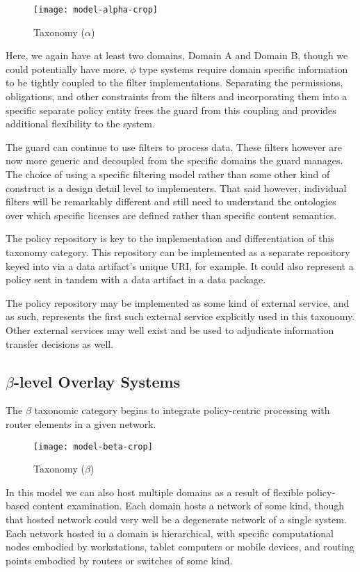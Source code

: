 \begin{figure}[!t]
\centering
\texttt{[image: model-alpha-crop]}
\caption{Taxonomy ($\alpha$)}
\label{fig:model:taxonomy-alpha}
\end{figure}

Here, we again have at least two domains, Domain A and Domain B, though we could potentially have more.  $\phi$ type systems require domain specific information to be tightly coupled to the filter implementations.  Separating the permissions, obligations, and other constraints from the filters and incorporating them into a specific separate policy entity frees the guard from this coupling and provides additional flexibility to the system.

The guard can continue to use filters to process data.  These filters however are now more generic and decoupled from the specific domains the guard manages.  The choice of using a specific filtering model rather than some other kind of construct is a design detail level to implementers.  That said however, individual filters will be remarkably different and still need to understand the ontologies over which specific licenses are defined rather than specific content semantics.

The policy repository is key to the implementation and differentiation of this taxonomy category.  This repository can be implemented as a separate repository keyed into via a data artifact's unique URI, for example.  It could also represent a policy sent in tandem with a data artifact in a data package.

The policy repository may be implemented as some kind of external service, and as such, represents the first such external service explicitly used in this taxonomy.  Other external services may well exist and be used to adjudicate information transfer decisions as well.

\subsection{$\beta$-level Overlay Systems}
The $\beta$ taxonomic category begins to integrate policy-centric processing with router elements in a given network.

\begin{figure}[!t]
\centering
\texttt{[image: model-beta-crop]}
\caption{Taxonomy ($\beta$)}
\label{fig:model:taxonomy-beta}
\end{figure}

In this model we can also host multiple domains as a result of flexible policy-based content examination.  Each domain hosts a network of some kind, though that hosted network could very well be a degenerate network of a single system.  Each network hosted in a domain is hierarchical, with specific computational nodes embodied by workstations, tablet computers or mobile devices, and routing points embodied by routers or switches of some kind.

